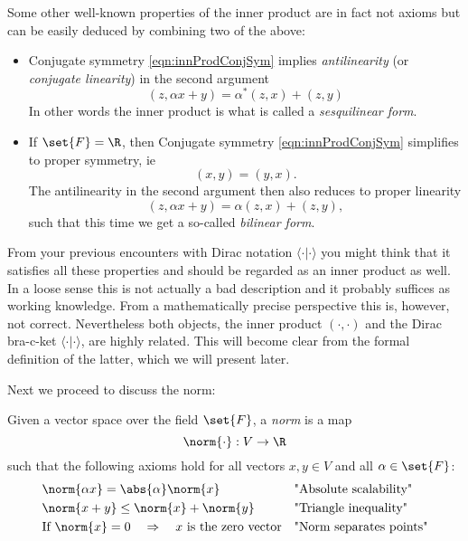 \begin{rem}
	Some other well-known properties of the inner product are in fact not axioms but can be easily deduced by combining two of the above:
	\begin{itemize}
		\item Conjugate symmetry \eqref{eqn:innProdConjSym} implies \emph{antilinearity} (or \emph{conjugate linearity}) in the second argument
			\begin{equation}
				(z, \alpha x + y) = \alpha^\ast (z,x) + (z,y)
				\label{eqn:innProdAntiLinRight}
			\end{equation}
			In other words the inner product is what is called a \emph{sesquilinear form}.

		\item If $\set{F} = \R$, then Conjugate symmetry \eqref{eqn:innProdConjSym} simplifies to proper symmetry, ie
			\[ (x,y) = (y,x). \]
			The antilinearity in the second argument then also reduces to proper linearity
			\begin{equation}
				(z, \alpha x + y) = \alpha (z,x) + (z,y),
				\label{eqn:innProdLinRight}
			\end{equation}
			such that this time we get a so-called \emph{bilinear form}.
	\end{itemize}
\end{rem}

\begin{nte}
	From your previous encounters with Dirac notation $\langle \cdot | \cdot \rangle$ you might think that it satisfies all these properties and should be regarded as an inner product as well.
	In a loose sense this is not actually a bad description and it probably suffices as working knowledge.
	From a mathematically precise perspective this is, however, not correct. 
	Nevertheless both objects, the inner product $(\cdot,\cdot)$ and the Dirac bra-c-ket $\langle \cdot | \cdot \rangle$, are highly related. This will become clear from the formal definition of the latter, which we will present later.
\end{nte}



\noindent
Next we proceed to discuss the norm:
\begin{defn}
	Given a vector space over the field $\set{F}$, a \emph{norm} is a map
	\[ \norm{\cdot} : V \to \R \]
	such that the following axioms hold for all vectors $x,y \in V$ and all $\alpha \in \set{F}$:
	\begin{align} 
		\label{eqn:normScalability}  &\norm{\alpha x} = \abs{\alpha} \norm{x} &&                           \text{"Absolute scalability"} \\
		\label{eqn:normTriaIneq}     &\norm{x + y} \le \norm{x} + \norm{y}    &&                           \text{"Triangle inequality"} \\
		\label{eqn:normPointSep}     &\text{If}~\norm{x} = 0 \quad \Rightarrow \quad \text{$x$ is the zero vector} &&  \text{"Norm separates points"}
	\end{align}
\end{defn}

